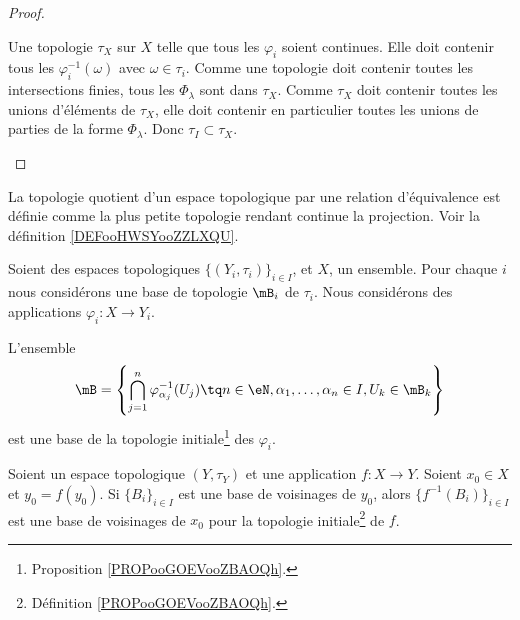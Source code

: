 \begin{proof}
\begin{subproof}
		Une topologie \( \tau_X\) sur \( X\) telle que tous les \( \varphi_i\) soient continues. Elle doit contenir tous les \( \varphi_i^{-1}(\omega)\) avec \( \omega\in \tau_i\). Comme une topologie doit contenir toutes les intersections finies, tous les \( \Phi_{\lambda}\) sont dans \( \tau_X\). Comme \( \tau_X\) doit contenir toutes les unions d'éléments de \( \tau_X\), elle doit contenir en particulier toutes les unions de parties de la forme \( \Phi_{\lambda}\). Donc \( \tau_I\subset\tau_X\).
	\end{subproof}
\end{proof}

La topologie quotient d'un espace topologique par une relation d'équivalence est définie comme la plus petite topologie rendant continue la projection. Voir la définition \ref{DEFooHWSYooZZLXQU}.

\begin{lemma}     \label{LEMooVRGFooNgbwKu}
	Soient des espaces topologiques \( \{ (Y_i,\tau_i) \}_{i\in I}\), et \( X\), un ensemble. Pour chaque \( i\) nous considérons une base de topologie \( \mB_i\) de \( \tau_i\). Nous considérons des applications \( \varphi_i\colon X\to Y_i\).

	L'ensemble
	\begin{equation}
		\mB=\left\{ \bigcap_{j=1}^n \varphi^{-1}_{\alpha_j}(U_j)\tq n\in \eN,\alpha_1,\ldots,\alpha_n\in I,U_k\in \mB_k \right\}
	\end{equation}
	est une base de la topologie initiale\footnote{Proposition \ref{PROPooGOEVooZBAOQh}.} des \( \varphi_i\).
\end{lemma}


\begin{proposition}		\label{PROPooOPJCooAIUXCW}
	Soient un espace topologique \( (Y,\tau_Y)\) et une application \(f \colon X\to Y  \). Soient \( x_0\in X\) et \( y_0=f(y_0)\). Si \( \{ B_i \}_{i\in I}\) est une base de voisinages de \( y_0\), alors \( \{ f^{-1}(B_i) \}_{i\in I}\) est une base de voisinages de \( x_0\) pour la topologie initiale\footnote{Définition \ref{PROPooGOEVooZBAOQh}.} de \( f\).
\end{proposition}

